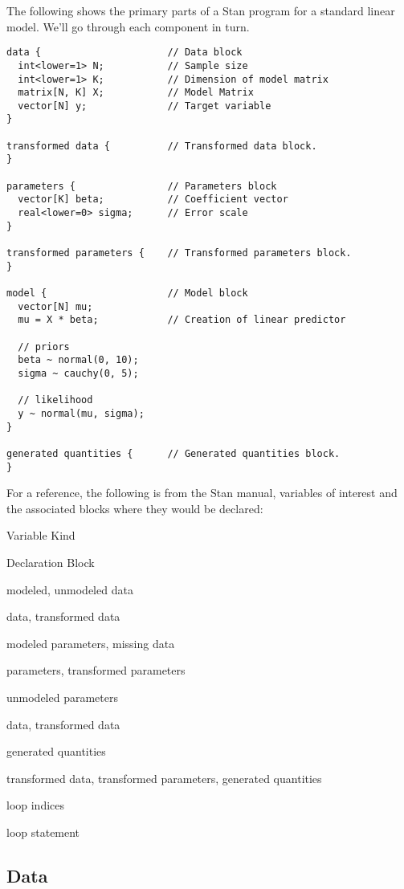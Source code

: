 \documentclass[]{book}
\begin{document}
The following shows the primary parts of a Stan program for a standard
linear model. We'll go through each component in turn.

\begin{verbatim}
data {                      // Data block
  int<lower=1> N;           // Sample size
  int<lower=1> K;           // Dimension of model matrix
  matrix[N, K] X;           // Model Matrix
  vector[N] y;              // Target variable
}

transformed data {          // Transformed data block.
} 

parameters {                // Parameters block
  vector[K] beta;           // Coefficient vector
  real<lower=0> sigma;      // Error scale
}

transformed parameters {    // Transformed parameters block.
} 

model {                     // Model block
  vector[N] mu;
  mu = X * beta;            // Creation of linear predictor
  
  // priors
  beta ~ normal(0, 10);
  sigma ~ cauchy(0, 5);     
  
  // likelihood
  y ~ normal(mu, sigma);
}

generated quantities {      // Generated quantities block. 
}
\end{verbatim}

For a reference, the following is from the Stan manual, variables of
interest and the associated blocks where they would be declared:

Variable Kind

Declaration Block

modeled, unmodeled data

data, transformed data

modeled parameters, missing data

parameters, transformed parameters

unmodeled parameters

data, transformed data

generated quantities

transformed data, transformed parameters, generated quantities

loop indices

loop statement

\subsection{Data}\label{data}
\end{document}
